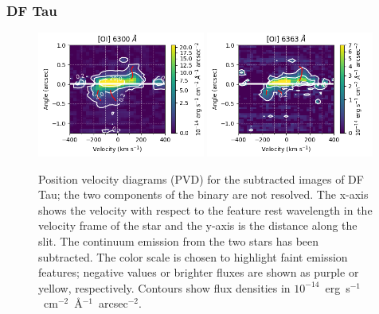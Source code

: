 \documentclass[twocolumn,trackchanges]{aastex63}
\begin{document}
\subsubsection{DF Tau}
\begin{figure}
\begin{center}
\includegraphics[width=0.49\textwidth]{DF_6300.png}
\includegraphics[width=0.49\textwidth]{DF_6363.png}
\caption{Position velocity diagrams (PVD) for the subtracted images
of DF Tau; the two components of the binary are not resolved. The x-axis
shows the velocity with respect to the feature rest wavelength in the
velocity frame of the star and the y-axis is the distance along the slit. The
continuum emission from the two stars has been subtracted. The color scale is
chosen to highlight faint emission features; negative values or brighter fluxes
are shown as purple or yellow, respectively.  Contours show flux densities in $10^{-14}$~erg~s$^{-1}$~cm$^{-2}$~\AA{}$^{-1}$~arcsec$^{-2}$.
\label{fig:DFTau}}
\end{center}
\end{figure}
\end{document}
